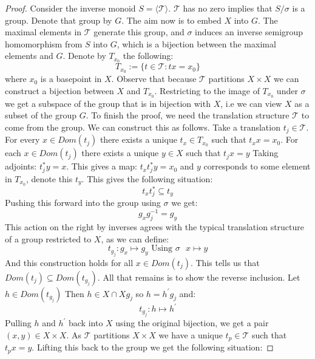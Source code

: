 \documentclass[11pt]{amsart}
\theoremstyle{plain}
\theoremstyle{definition}%
\theoremstyle{remark}%
\begin{document}
\begin{proof}
Consider the inverse monoid $S = \langle \mathcal{T} \rangle$. $\mathcal{T}$ has no zero implies that $S/\sigma$ is a group. Denote that group by $G$. The aim now is to embed $X$ into $G$. The maximal elements in $\mathcal{T}$ generate this group, and $\sigma$ induces an inverse semigroup homomorphism from $S$ into $G$, which is a bijection between the maximal elements and $G$. Denote by $T_{x_{0}}$ the following:
\begin{equation}
T_{x_{0}} := \lbrace t \in \mathcal{T} : tx=x_{0} \rbrace
\end{equation}
where $x_{0}$ is a basepoint in $X$. Observe that because $\mathcal{T}$ partitions $X \times X$ we can construct a bijection between $X$ and $T_{x_{0}}$. Restricting to the image of $T_{x_{0}}$ under $\sigma$ we get a subspace of the group that is in bijection with $X$, i.e we can view $X$ as a subset of the group $G$. To finish the proof, we need the translation structure $\mathcal{T}$ to come from the group. We can construct this as follows. Take a translation $t_{j} \in \mathcal{T}$. For every $x \in Dom(t_{j})$ there exists a unique $t_{x} \in T_{x_{0}}$ such that $t_{x}x=x_{0}$. For each $x \in Dom(t_{j})$ there exists a unique $y \in X$ such that $t_{j}x=y$ Taking adjoints: $t_{j}^{*}y=x$. This gives a map: $t_{x}t_{j}^{*}y=x_{0}$ and $y$ corresponds to some element in $T_{x_{0}}$, denote this $t_{y}$. This gives the following situation:
\begin{equation}
t_{x}t_{j}^{*} \subseteq t_{y}
\end{equation} 
Pushing this forward into the group using $\sigma$ we get:
\begin{equation}
g_{x}g_{j}^{-1}=g_{y}
\end{equation}
This action on the right by inverses agrees with the typical translation structure of a group restricted to $X$, as we can define:
\begin{equation}
t_{g_{j}}:g_{x} \mapsto g_{y} \mbox{ Using $\sigma$ } x \mapsto y
\end{equation}
And this construction holds for all $x\in Dom(t_{j})$. This tells us that $Dom(t_{j}) \subseteq Dom(t_{g_{j}})$. All that remains is to show the reverse inclusion. Let $h \in Dom(t_{g_{j}})$ Then $h \in X \cap Xg_{j}$ so $h=h^{'}g_{j}$ and:
\begin{equation}
t_{g_{j}}:h \mapsto h^{'}
\end{equation}
Pulling $h$ and $h^{'}$ back into $X$ using the original bijection, we get a pair $(x,y) \in X \times X$. As $\mathcal{T}$ partitions $X\times X$ we have a unique $t_{p} \in \mathcal{T}$ such that $t_{p}x=y$. Lifting this back to the group we get the following situation:

\end{proof}
\end{document}
